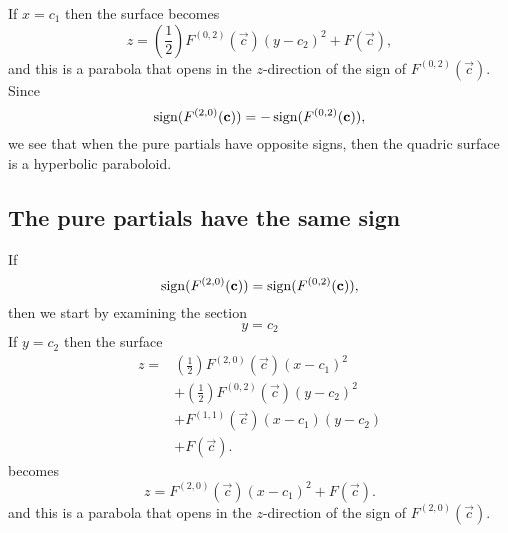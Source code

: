 \documentclass{ximera}
\begin{document}
If $x=c_1$ then the surface becomes
\[
z = \left(\frac{1}{2}\right)F^{(0,2)}(\vec{c})(y-c_2)^2 + F(\vec{c}),
\]
and this is a parabola that opens in the $z$-direction of the sign of
$F^{(0,2)}(\vec{c})$. Since 
\[
\operatorname{sign}(F^{(2,0)}(\mathbf{c})) = -\operatorname{sign}(F^{(0,2)}(\mathbf{c})),
\]
we see that when the pure partials have opposite signs, then the
quadric surface is a hyperbolic paraboloid.

\subsection{The pure partials have the same sign}
If 
\[
\operatorname{sign}(F^{(2,0)}(\mathbf{c})) = \operatorname{sign}(F^{(0,2)}(\mathbf{c})),
\]
then we start by examining the section
\[
y= c_2
\]
If $y=c_2$ then the surface
\begin{align*}
  z = &\left(\frac{1}{2}\right)F^{(2,0)}(\vec{c})(x-c_1)^2\\
  &+ \left(\frac{1}{2}\right)F^{(0,2)}(\vec{c})(y-c_2)^2 \\
  &+ F^{(1,1)}(\vec{c}) (x-c_1)(y-c_2)\\
  &+ F(\vec{c}).
\end{align*}
becomes
\[
z = F^{(2,0)}(\vec{c})(x-c_1)^2 + F(\vec{c}).
\]
and this is a parabola that opens in the $z$-direction of the sign of
$F^{(2,0)}(\vec{c})$.
\end{document}
